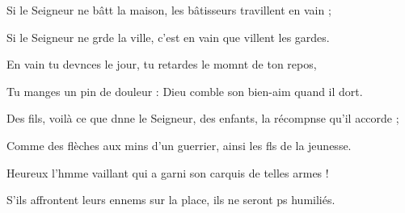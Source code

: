 \item Si le Seigneur ne bâtt la maison,\psstar{} les bâtisseurs travillent en vain ; 
\item Si le Seigneur ne grde la ville,\psstar{} c’est en vain que villent les gardes.
\item En vain tu devnces le jour,\psstar{} tu retardes le momnt de ton repos,
\item Tu manges un pin de douleur :\psstar{} Dieu comble son bien-aim quand il dort.
\item Des fils, voilà ce que dnne le Seigneur,\psstar{} des enfants, la récompnse qu’il accorde ;
\item Comme des flèches aux mins d’un guerrier,\psstar{} ainsi les fls de la jeunesse.
\item Heureux l’hmme vaillant\psstar{} qui a garni son carquis de telles armes ! 
\item S’ils affrontent leurs ennems sur la place,\psstar{} ils ne seront ps humiliés.